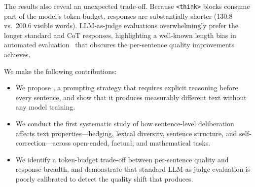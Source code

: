 The results also reveal an unexpected trade-off.
Because \texttt{<think>} blocks consume part of the model's token budget, \iscotshort responses are substantially shorter (130.8 vs.\ 200.6 visible words).
LLM-as-judge evaluations overwhelmingly prefer the longer standard and CoT responses, highlighting a well-known length bias in automated evaluation~\citep{zheng2023judging} that obscures the per-sentence quality improvements \iscotshort achieves.

We make the following contributions:
\begin{itemize}[leftmargin=*,itemsep=0pt,topsep=0pt]
    \item We propose \iscot, a prompting strategy that requires explicit reasoning before every sentence, and show that it produces measurably different text without any model training.
    \item We conduct the first systematic study of how sentence-level deliberation affects text properties---hedging, lexical diversity, sentence structure, and self-correction---across open-ended, factual, and mathematical tasks.
    \item We identify a token-budget trade-off between per-sentence quality and response breadth, and demonstrate that standard LLM-as-judge evaluation is poorly calibrated to detect the quality shift that \iscotshort produces.
\end{itemize}
